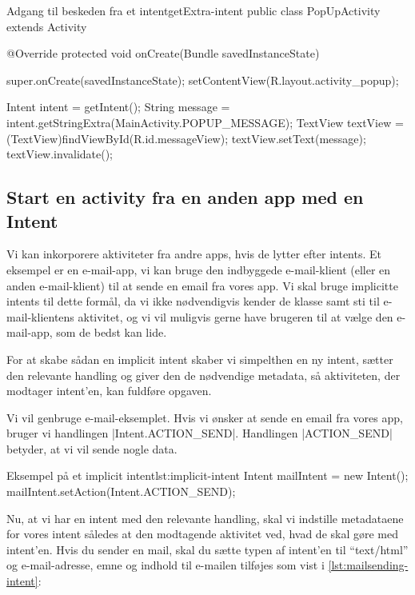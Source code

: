 \begin{example}\noindent
	\begin{JavaCode}{Adgang til beskeden fra et intent}{getExtra-intent}
		public class PopUpActivity extends Activity {
			
			@Override
			protected void onCreate(Bundle savedInstanceState) {
				super.onCreate(savedInstanceState);
				setContentView(R.layout.activity_popup);
				
				Intent intent = getIntent();
				String message = intent.getStringExtra(MainActivity.POPUP_MESSAGE);
				TextView textView = (TextView)findViewById(R.id.messageView);
				textView.setText(message);
				textView.invalidate();
			}
		}
	\end{JavaCode}
\end{example}

\subsection{Start en activity fra en anden app med en Intent}

Vi kan inkorporere aktiviteter fra andre apps, hvis de lytter efter intents. Et eksempel er en e-mail-app, vi kan bruge den indbyggede e-mail-klient (eller en anden e-mail-klient) til at sende en email fra vores app. Vi skal bruge implicitte intents til dette formål, da vi ikke nødvendigvis kender de klasse samt sti til e-mail-klientens aktivitet, og vi vil muligvis gerne have brugeren til at vælge den e-mail-app, som de bedst kan lide.

For at skabe sådan en implicit intent skaber vi simpelthen en ny intent, sætter den relevante handling og giver den de nødvendige metadata, så aktiviteten, der modtager intent'en, kan fuldføre opgaven.

Vi vil genbruge e-mail-eksemplet. Hvis vi ønsker at sende en email fra vores app, bruger vi handlingen \JavaInline|Intent.ACTION_SEND|. Handlingen \JavaInline|ACTION_SEND| betyder, at vi vil sende nogle data.

\begin{example}\noindent
	\begin{JavaCode}{Eksempel på et implicit intent}{lst:implicit-intent}
		Intent mailIntent = new Intent();
		mailIntent.setAction(Intent.ACTION_SEND);
	\end{JavaCode}
\end{example}

Nu, at vi har en intent med den relevante handling, skal vi indstille metadataene for vores intent således at den modtagende aktivitet ved, hvad de skal gøre med intent'en. Hvis du sender en mail, skal du sætte typen af intent'en til ``text/html'' og e-mail-adresse, emne og indhold til e-mailen tilføjes som vist i \autoref{lst:mailsending-intent}:

